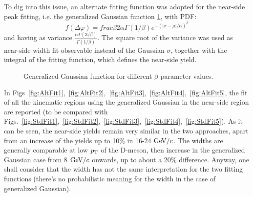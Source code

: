 To dig into this issue, an alternate fitting function was adopted for the near-side peak fitting, i.e. the generalized Gaussian function \ref{fig:GenGauss}, with PDF:
\begin{equation}
f(\Delta\varphi) = frac{\beta}{2\alpha\Gamma(1/\beta)}e^{-(|x-\mu|/\alpha)^\beta}
\end{equation}
and having as variance $\frac{\alpha\Gamma(3/\beta)}{\Gamma(1/\beta)}$.
The square root of the variance was used as near-side width fit observable instead of the Gaussian $\sigma$, together with the integral of the fitting function, which defines the near-side yield.

\begin{figure}[h]
\centering
{}
\caption{Generalized Gaussian function for different $\beta$ parameter values.}
\label{fig:GenGauss}
\end{figure}

In Figs~\ref{fig:AltFit1},~\ref{fig:AltFit2},~\ref{fig:AltFit3},~\ref{fig:AltFit4},~\ref{fig:AltFit5}, the fit of all the kinematic regions using the generalized Gaussian in the near-side region are reported (to be compared with Figs.~\ref{fig:StdFit1},~\ref{fig:StdFit2},~\ref{fig:StdFit3},~\ref{fig:StdFit4},~\ref{fig:StdFit5}).
As it can be seen, the near-side yields remain very similar in the two approaches, apart from an increase of the yields up to 10\% in 16-24 $\mathrm{GeV}/c$. The widths are generally comparable at low $p_{\rm T}$ of the D-meson, then increase in the generalized Gaussian case from 8 $\mathrm{GeV}/c$ onwards, up to about a 20\% difference. Anyway, one shall consider that the width has not the same interpretation for the two fitting functions (there's no probabilistic meaning for the width in the case of generalized Gaussian).

